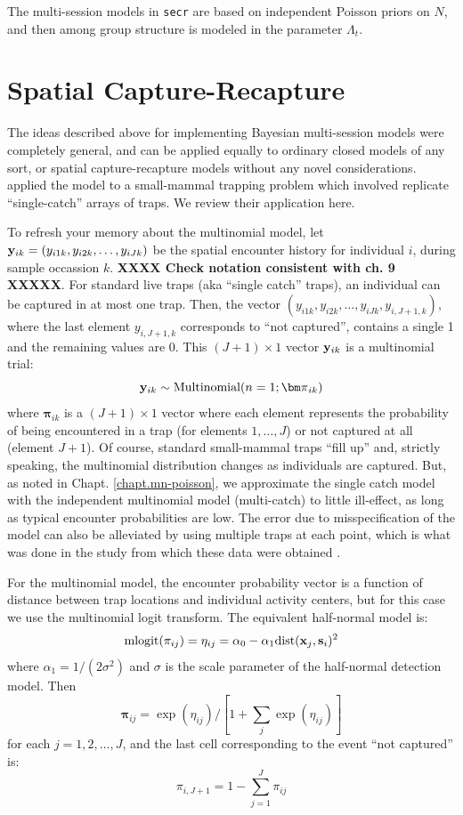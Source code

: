 The multi-session models in \mbox{\tt secr}  are based on independent
Poisson priors on $N$, and then among group structure is modeled in
the parameter $\Lambda_{t}$. 


\section{Spatial Capture-Recapture}


The ideas described above for implementing Bayesian multi-session
models were completely general, and can be applied equally to ordinary
closed models of any sort, or spatial capture-recapture models without
any novel considerations.  \citet{royle_converse:2013} applied the
model to a small-mammal trapping problem which involved replicate
``single-catch'' arrays of traps. We review their application here.

To refresh your memory about the multinomial model, let ${\bf y}_{ik}
= (y_{i1k},y_{i2k},\ldots,y_{iJk})$ be the spatial encounter history
for individual $i$, during sample occassion $k$.  {\bf XXXX Check
  notation consistent with ch. 9 XXXXX}.  For standard live traps (aka
``single catch'' traps), an individual can be captured in at most one
trap. Then, the vector $(y_{i1k},y_{i2k},\ldots,y_{iJk},y_{i,J+1,k})$,
where the last element $y_{i,J+1,k}$ corresponds to ``not captured'',
contains a single 1 and the remaining values are 0.  This $(J+1)\times
1$ vector ${\bf y}_{ik}$ is a multinomial trial:
\[
{\bf y}_{ik} \sim \mbox{Multinomial}(n=1; {\bm \pi}_{ik} )
\]
where ${\bm \pi}_{ik}$ is a $(J+1) \times 1$ vector where each element
represents the probability of being encountered in a trap (for
elements $1,\ldots,J$) or not captured at all (element $J+1$). Of
course, standard small-mammal traps ``fill up'' and, strictly
speaking, the multinomial distribution changes as individuals are
captured. But, as noted in Chapt. \ref{chapt.mn-poisson}, we
approximate the single catch model with the independent multinomial
model (multi-catch) to little ill-effect, as long as typical encounter
probabilities are low. The error due to misspecification of the model
can also be alleviated by using multiple traps at each point, which is
what was done in the study from which these data were obtained
\citep{converse_etal:2006ecol, converse_etal:2006jwm}.

For the multinomial model, the encounter probability vector is a
function of distance between trap locations and individual activity
centers, but for this case we use the multinomial logit transform. The
equivalent half-normal model is:
\begin{equation}
\mbox{mlogit}(\pi_{ij}) = \eta_{ij}  =  \alpha_0 - \alpha_{1} \mbox{dist}({\bf x}_{j},{\bf s}_{i})^2   
\label{hscr.eq.mlogit}
\end{equation}
where $\alpha_{1} = 1/(2\sigma^2)$ and $\sigma$ is the scale
parameter of the half-normal detection model.  Then
\[
{\bm \pi}_{ij} = \exp(\eta_{ij})/[ 1 + \sum_{j} \exp(\eta_{ij}) ]
\]
for each $j=1,2,\ldots,J$, and the last cell corresponding to the
event ``not captured'' is:
\[
\pi_{i,J+1} = 1- \sum_{j=1}^{J} \pi_{ij}
\]

